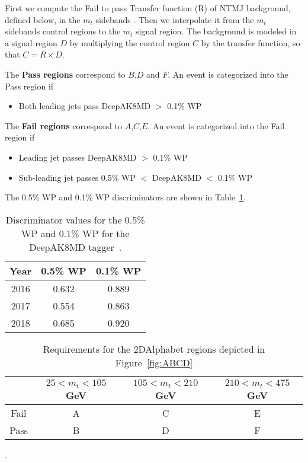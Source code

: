 First we compute the Fail to pass Transfer function (R) of NTMJ background, defined below, in the $m_{t}$ sidebands . Then we interpolate it from the $m_{t} $ sidebands control regions to the $m_{t}$ signal region. The background is modeled in a signal region $D$ by multiplying the control region $C$ by the transfer function, so that $C = R\times D$.


The  \textbf{Pass regions} correspond  to $B$,$D$ and $F$. An event is categorized into the Pass region if 
\begin{itemize}
	\item Both leading jets pass DeepAK8MD $>$ 0.1\% WP
\end{itemize}

The  \textbf{Fail regions} correspond to $A$,$C$,$E$. An event is categorized into the Fail region if
\begin{itemize}
	\item Leading  jet passes DeepAK8MD $>$ 0.1\% WP
	\item Sub-leading jet passes  0.5\% WP $<$ DeepAK8MD $<$  0.1\% WP
\end{itemize}


The 0.5\% WP and 0.1\% WP discriminators are shown in Table~\ref{tab:deepak8-pass-fail}.


\begin{table}[h!]
\centering
\begin{tabular}{|| c c c ||} 
 \hline
 Year & 0.5\% WP &  0.1\% WP \\ 
 \hline\hline
 2016 & 0.632 & 0.889  \\ 
 2017 & 0.554 & 0.863  \\ 
 2018 & 0.685 & 0.920  \\ 
 \hline
\end{tabular}
\caption{Discriminator values for the 0.5\% WP and 0.1\% WP for the DeepAK8MD tagger~\cite{DeepAK8TopTagwiki}.}
\label{tab:deepak8-pass-fail}
\end{table}


\begin{table}[h!]
	\centering
	\begin{tabular}{|| c || c | c | c||} 
 		 \hline
       & $25 < m_t < 105$ GeV & $105 < m_t < 210$ GeV & $210 < m_t < 475$ GeV \\ [0.5ex]  \hline\hline
		 Fail & A & C & E \\ [0.5ex] 
		 \hline 
		 Pass & B & D & F \\ [0.5ex] \hline
\end{tabular}
\caption{Requirements for the 2DAlphabet regions depicted in Figure~\ref{fig:ABCD}}.
\label{tab:ABCD}
\end{table}

